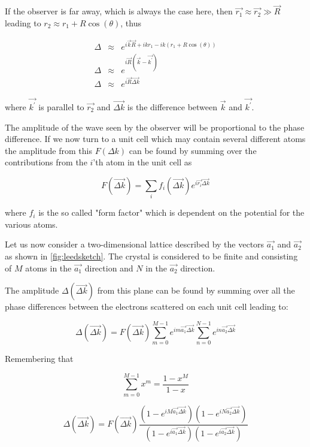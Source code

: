 If the observer is far away, which is always the case here, then $\vec{r_1}\approx\vec{r_2}\gg \vec{R}$ leading to $r_2\approx r_1+R\cos(\theta)$, thus

\begin{eqnarray}
\Delta	& \approx	& e^{i\vec{k}\vec{R}+ikr_1-ik(r_1+R\cos(\theta))}\\ 
\Delta	& \approx	& e^{i \vec{R}( \vec{k}-\vec{k^\prime})}\\
\Delta	& \approx	& e^{i\vec{R} \vec{\Delta k}}
\end{eqnarray}

\noindent where $\vec{k^\prime}$ is parallel to $\vec{r_2}$ and  $\vec{\Delta k}$ is the difference between $\vec{k}$ and $\vec{k^\prime}$.

The amplitude of the wave seen by the observer will be  proportional to the phase difference. If we now turn to a unit cell which may contain several different atoms the amplitude from this  $F(\Delta k)$ can be found by summing over the contributions from the $i$'th atom in the unit cell as

\begin{equation}
F(\vec{\Delta k})=\sum_i f_i(\vec{\Delta k})e^{i\vec{r_i}\vec{\Delta k}}
\end{equation}

\noindent where $f_i$ is the so called "form factor" which is dependent on the potential for the various atoms.

Let us now consider a two-dimensional lattice described by the vectors $\vec{a_1}$ and $\vec{a_2}$ as shown in \autoref{fig:leedsketch}. The crystal is considered to be finite and consisting of $M$ atoms in the $\vec{a_1}$ direction and $N$ in the $\vec{a_2}$ direction.

The amplitude $\Delta(\vec{\Delta k})$ from this plane can be found by summing over all the phase differences between the electrons scattered on each unit cell leading to:

\begin{equation}
\Delta(\vec{\Delta k})=F(\vec{\Delta k})\sum_{m=0}^{M-1}e^{im\vec{a_1}\vec{\Delta k}}\sum_{n=0}^{N-1}e^{in\vec{a_2}\vec{\Delta k}}
\end{equation}

Remembering that

\begin{equation}
\sum_{m=0}^{M-1}x^m=\frac{1-x^M}{1-x}
\end{equation}

\begin{equation}
\Delta(\vec{\Delta k})=F(\vec{\Delta k})\frac{(1-e^{iM\vec{a_1}\vec{\Delta k}})(1-e^{iN\vec{a_2}\vec{\Delta k}})}{(1-e^{i\vec{a_1}\vec{\Delta k}})(1-e^{i\vec{a_2}\vec{\Delta k}})}
\end{equation}

